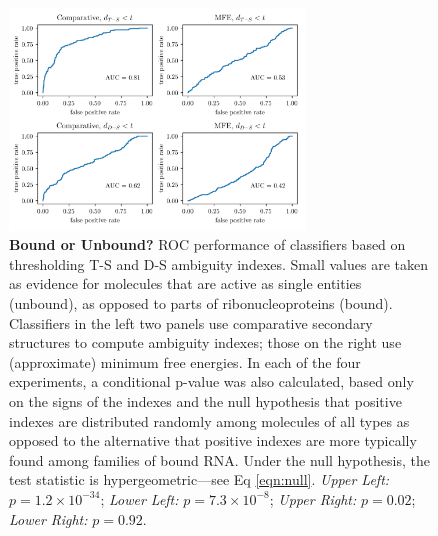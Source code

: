\begin{figure}[h!]
\centering
\includegraphics[width=0.7\textwidth]{bound_unbound.png}
\vglue 0.5cm

\caption{{\bf Bound or Unbound?} ROC performance of classifiers based on thresholding T-S
and D-S ambiguity indexes. Small values are taken as evidence for molecules that are active as
single entities (unbound), as opposed to parts of ribonucleoproteins (bound). Classifiers in the
left two panels use comparative secondary structures to compute ambiguity indexes; those on the
right use (approximate) minimum free energies. In each of the four experiments, a conditional
p-value was also calculated, based only on the signs of the indexes and the null hypothesis that
positive indexes are distributed randomly among molecules of all types as opposed to the alternative
that positive indexes are more typically found among families of bound RNA. Under the null hypothesis,
the test statistic is hypergeometric---see Eq \ref{eqn:null}. {\em Upper Left:} $p= 1.2 \times 10^{-34} $;
{\em Lower Left:} $p=7.3 \times 10^{-8}$; {\em Upper Right:} $p=0.02$;  {\em Lower Right:} $p=0.92$.}
\label{fig:UnboundVSBound}
\end{figure}

